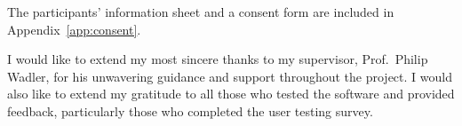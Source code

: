 \documentclass[../main.tex]{subfiles}
\begin{document}
\begin{preliminary}
\begin{ethics}
        The participants' information sheet and a consent form are included in
            Appendix~\ref{app:consent}.
        \\

        \standarddeclaration
    \end{ethics}

    \begin{acknowledgements}
        I would like to extend my most sincere thanks to my supervisor, Prof.~Philip
            Wadler, for his unwavering guidance and support throughout the project.
        I would also like to extend my gratitude to all those who tested the software
            and provided feedback, particularly those who completed the user testing
            survey.
    \end{acknowledgements}

    \tableofcontents
\end{preliminary}
\end{document}
